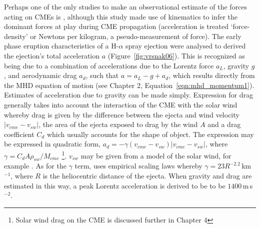 Perhaps one of the only studies to make an observational estimate of the forces acting on CMEs is \citet{vrs06}, although this study made use of kinematics to infer the dominant forces at play during CME propagation (acceleration is treated  \textquoteleft force-density' or Newtons per kilogram, a pseudo-measurement of force). The early phase eruption characteristics of a H-$\alpha$ spray ejection were analysed to derived the ejection's total acceleration $a$ (Figure~\ref{fig:vrsnak06}). This is recognized as being due to a combination of accelerations due to the Lorentz force $a_L$, gravity $g$, and aerodynamic drag $a_d$, such that $a = a_L -g +a_d$, which results directly from the MHD equation of motion (see Chapter 2, Equation~\ref{eqn:mhd_momentum1}). Estimates of acceleration due to gravity can be made simply. Expression for drag generally takes into account the interaction of the CME with the solar wind whereby drag is given by the difference between the ejecta and wind velocity $|v_{cme} - v_{sw}|$, the area of the ejecta exposed to drag by the wind $A$ and a drag coefficient $C_d$ which usually accounts for the shape of object. The expression may be expressed in quadratic form, $a_d = - \gamma(v_{cme} - v_{sw})|v_{cme} - v_{sw}|$, where $\gamma = C_dA\rho_{sw}/M_{cme}$ \citep{cargill2004}\footnote{Solar wind drag on the CME is discussed further in Chapter 4}. $v_{sw}$ may be given from a model of the solar wind, for example \citet{sheeley1997}. As for the $\gamma$ term,\citet{vrs06} uses empirical scaling laws whereby $\gamma =  23R^{-2.2}$\,km$^{-1}$, where $R$ is the heliocentric distance of the ejecta. When gravity and drag are estimated in this way, a peak Lorentz acceleration is derived to be to be $1400$\,m\,s$^{-2}$. 
